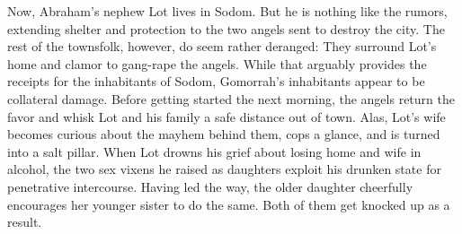 Now, Abraham's nephew Lot lives in Sodom. But he is nothing like the rumors,
extending shelter and protection to the two angels sent to destroy the city. The
rest of the townsfolk, however, do seem rather deranged: They surround Lot's
home and clamor to gang-rape the angels. While that arguably provides the
receipts for the inhabitants of Sodom, Gomorrah's inhabitants appear to be
collateral damage. Before getting started the next morning, the angels return
the favor and whisk Lot and his family a safe distance out of town. Alas, Lot's
wife becomes curious about the mayhem behind them, cops a glance, and is turned
into a salt pillar. When Lot drowns his grief about losing home and wife in
alcohol, the two sex vixens he raised as daughters exploit his drunken state for
penetrative intercourse. Having led the way, the older daughter cheerfully
encourages her younger sister to do the same. Both of them get knocked up as a
result.

